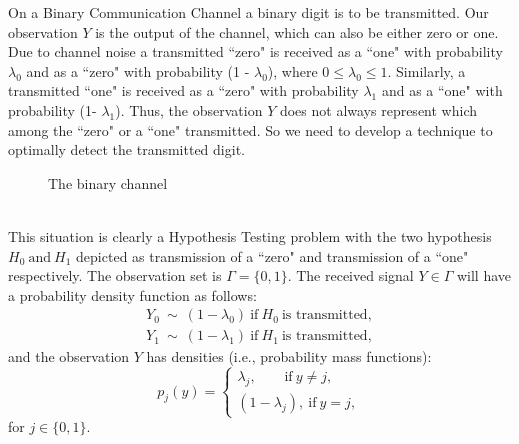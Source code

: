 \documentclass[a4paper,english,12pt]{article}
\begin{document}
\begin{exmp}
On a Binary Communication Channel a binary digit is to be transmitted. Our observation $Y$ is the output of the channel, which can also be either zero or one. Due to channel noise a transmitted ``zero" is received as a ``one" with probability $\lambda_0$ and as a ``zero" with probability (1 - $\lambda_0$), where $0 \leq \lambda_0 \leq 1$. Similarly, a transmitted ``one" is received as a ``zero" with probability $\lambda_1$ and as a ``one" with probability (1- $\lambda_1$). Thus, the observation $Y$ does not always represent which among the ``zero" or a ``one" transmitted. So we need to develop a technique to optimally detect the transmitted digit.
\begin{figure}[h]
\centering

\caption{The binary channel}
\label{fig:binary}
\end{figure}\\
This situation is clearly a Hypothesis Testing problem with the two hypothesis $ H_0~ \mbox{and}~ H_1 $ depicted as transmission of a ``zero" and transmission of a ``one" respectively. The observation set is $\Gamma=\{0,1\}$. The received signal $Y \in \Gamma$  will have a probability density function as follows:
\begin{eqnarray}
Y_{0}~\sim~\left( 1-\lambda_{0}\right) ~\mbox{if}~H_0~\mbox{is~transmitted},\\\nonumber
Y_{1}~\sim~\left( 1-\lambda_{1}\right)~\mbox{if}~H_1~\mbox{is~transmitted}, 
\end{eqnarray}
and the observation $Y$ has densities (i.e., probability mass functions):
\begin{equation}
p_{j}\left( y\right) = \begin{cases}
\lambda_{j} ,~~~~~~~~~\mbox{if}~ y\neq j,\\
\left( 1-\lambda_{j}\right),~\mbox{if}~ y=j,
\end{cases}
\end{equation}
for $j \in \{0,1\}$.

\end{exmp}
\end{document}
